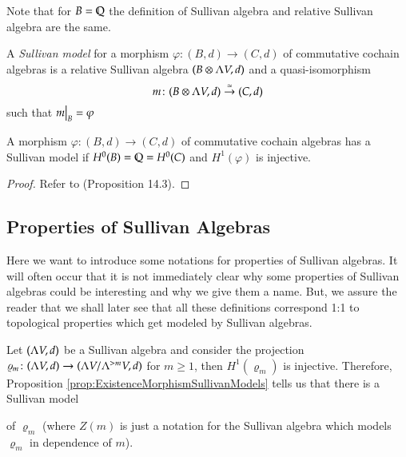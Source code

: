 \begin{Remark}
 Note that for $B = \mathbb{Q}$ the definition of Sullivan algebra and relative Sullivan algebra are the same.
\end{Remark}

\begin{Definition}

 A \emph{Sullivan model} for a morphism $\varphi \colon (B,d) \to (C,d)$ of commutative cochain algebras is
 a relative Sullivan algebra $(B \otimes \Lambda V,d)$ and a quasi-isomorphism
 $$ m \colon (B \otimes \Lambda V,d) \overset{\simeq}{\to} (C,d) $$
 such that $\restr{m}{B} = \varphi$ 
\end{Definition}

\begin{Proposition}
\label{prop:ExistenceMorphismSullivanModels}
 A morphism $\varphi \colon (B,d) \to (C,d)$ of commutative cochain algebras has a Sullivan model
 if $H^0(B) = \mathbb{Q} = H^0(C)$ and $H^1(\varphi)$ is injective.
\end{Proposition}
\begin{proof}
 Refer to \cite{Felix2001} (Proposition 14.3).
\end{proof}

\subsection{Properties of Sullivan Algebras}
Here we want to introduce some notations for properties of Sullivan algebras. It will often occur that it is not 
immediately clear why some properties of Sullivan algebras could be interesting and why we give them a name. But, we assure
the reader that we shall later see that all these definitions correspond 1:1 to topological properties which
get modeled by Sullivan algebras.
\par

Let $(\Lambda V,d)$ be a Sullivan algebra and consider the projection 
$\varrho_m \colon (\Lambda V,d) \to (\Lambda V / \Lambda^{> m} V , d)$ for $m \geq 1$, then $H^1(\varrho_m)$ is injective.
Therefore, Proposition \ref{prop:ExistenceMorphismSullivanModels} tells us that there is a Sullivan model

\centerline{
}

of $\varrho_m$ (where $Z(m)$ is just a notation for the Sullivan algebra which models $\varrho_m$ in dependence of $m$).


